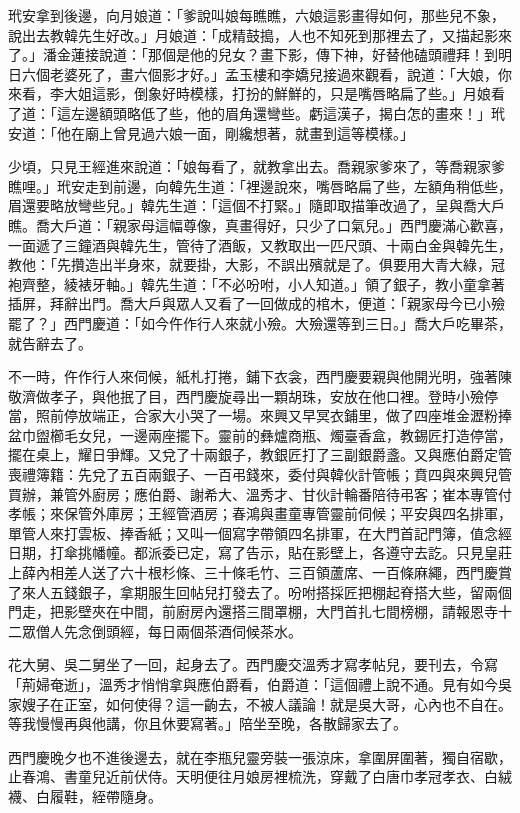 玳安拿到後邊，向月娘道：「爹說叫娘每瞧瞧，六娘這影畫得如何，那些兒不象，說出去教韓先生好改。」月娘道：「成精鼓搗，人也不知死到那裡去了，又描起影來了。」潘金蓮接說道：「那個是他的兒女？畫下影，傳下神，好替他磕頭禮拜！到明日六個老婆死了，畫六個影才好。」孟玉樓和李嬌兒接過來觀看，說道：「大娘，你來看，李大姐這影，倒象好時模樣，打扮的鮮鮮的，只是嘴唇略扁了些。」月娘看了道：「這左邊額頭略低了些，他的眉角還彎些。虧這漢子，揭白怎的畫來！」玳安道：「他在廟上曾見過六娘一面，剛纔想著，就畫到這等模樣。」

少頃，只見王經進來說道：「娘每看了，就教拿出去。喬親家爹來了，等喬親家爹瞧哩。」玳安走到前邊，向韓先生道：「裡邊說來，嘴唇略扁了些，左額角稍低些，眉還要略放彎些兒。」韓先生道：「這個不打緊。」隨即取描筆改過了，呈與喬大戶瞧。喬大戶道：「親家母這幅尊像，真畫得好，只少了口氣兒。」西門慶滿心歡喜，一面遞了三鐘酒與韓先生，管待了酒飯，又教取出一匹尺頭、十兩白金與韓先生，教他：「先攢造出半身來，就要掛，大影，不誤出殯就是了。俱要用大青大綠，冠袍齊整，綾裱牙軸。」韓先生道：「不必吩咐，小人知道。」領了銀子，教小童拿著插屏，拜辭出門。喬大戶與眾人又看了一回做成的棺木，便道：「親家母今已小殮罷了？」西門慶道：「如今仵作行人來就小殮。大殮還等到三日。」喬大戶吃畢茶，就告辭去了。

不一時，仵作行人來伺候，紙札打捲，鋪下衣衾，西門慶要親與他開光明，強著陳敬濟做孝子，與他抿了目，西門慶旋尋出一顆胡珠，安放在他口裡。登時小殮停當，照前停放端正，合家大小哭了一場。來興又早冥衣鋪里，做了四座堆金瀝粉捧盆巾盥櫛毛女兒，一邊兩座擺下。靈前的彝爐商瓶、燭臺香盒，教錫匠打造停當，擺在桌上，耀日爭輝。又兌了十兩銀子，教銀匠打了三副銀爵盞。又與應伯爵定管喪禮簿籍：先兌了五百兩銀子、一百弔錢來，委付與韓伙計管帳；賁四與來興兒管買辦，兼管外廚房；應伯爵、謝希大、溫秀才、甘伙計輪番陪待弔客；崔本專管付孝帳；來保管外庫房；王經管酒房；春鴻與畫童專管靈前伺候；平安與四名排軍，單管人來打雲板、捧香紙；又叫一個寫字帶領四名排軍，在大門首記門簿，值念經日期，打傘挑幡幢。都派委已定，寫了告示，貼在影壁上，各遵守去訖。只見皇莊上薛內相差人送了六十根杉條、三十條毛竹、三百領蘆席、一百條麻繩，西門慶賞了來人五錢銀子，拿期服生回帖兒打發去了。吩咐搭採匠把棚起脊搭大些，留兩個門走，把影壁夾在中間，前廚房內還搭三間罩棚，大門首扎七間榜棚，請報恩寺十二眾僧人先念倒頭經，每日兩個茶酒伺候茶水。

花大舅、吳二舅坐了一回，起身去了。西門慶交溫秀才寫孝帖兒，要刊去，令寫「荊婦奄逝」，溫秀才悄悄拿與應伯爵看，伯爵道：「這個禮上說不通。見有如今吳家嫂子在正室，如何使得？這一齣去，不被人議論！就是吳大哥，心內也不自在。等我慢慢再與他講，你且休要寫著。」陪坐至晚，各散歸家去了。

西門慶晚夕也不進後邊去，就在李瓶兒靈旁裝一張涼床，拿圍屏圍著，獨自宿歇，止春鴻、書童兒近前伏侍。天明便往月娘房裡梳洗，穿戴了白唐巾孝冠孝衣、白絨襪、白履鞋，絰帶隨身。

